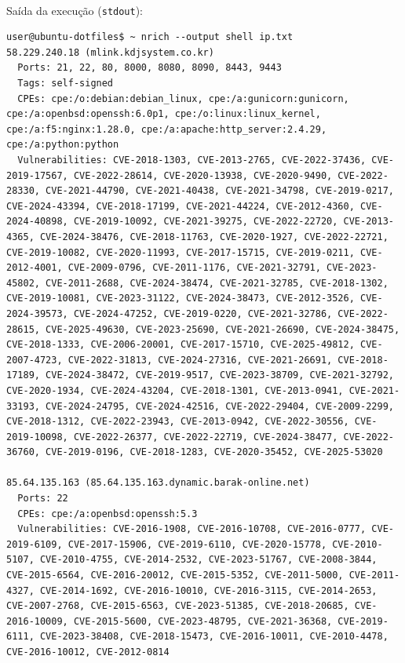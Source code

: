 \documentclass[12pt]{article}
\begin{document}
\paragraph{}Saída da execução (\texttt{stdout}):

\begin{lstlisting}
user@ubuntu-dotfiles$ ~ nrich --output shell ip.txt
58.229.240.18 (mlink.kdjsystem.co.kr)
  Ports: 21, 22, 80, 8000, 8080, 8090, 8443, 9443
  Tags: self-signed
  CPEs: cpe:/o:debian:debian_linux, cpe:/a:gunicorn:gunicorn, cpe:/a:openbsd:openssh:6.0p1, cpe:/o:linux:linux_kernel, cpe:/a:f5:nginx:1.28.0, cpe:/a:apache:http_server:2.4.29, cpe:/a:python:python
  Vulnerabilities: CVE-2018-1303, CVE-2013-2765, CVE-2022-37436, CVE-2019-17567, CVE-2022-28614, CVE-2020-13938, CVE-2020-9490, CVE-2022-28330, CVE-2021-44790, CVE-2021-40438, CVE-2021-34798, CVE-2019-0217, CVE-2024-43394, CVE-2018-17199, CVE-2021-44224, CVE-2012-4360, CVE-2024-40898, CVE-2019-10092, CVE-2021-39275, CVE-2022-22720, CVE-2013-4365, CVE-2024-38476, CVE-2018-11763, CVE-2020-1927, CVE-2022-22721, CVE-2019-10082, CVE-2020-11993, CVE-2017-15715, CVE-2019-0211, CVE-2012-4001, CVE-2009-0796, CVE-2011-1176, CVE-2021-32791, CVE-2023-45802, CVE-2011-2688, CVE-2024-38474, CVE-2021-32785, CVE-2018-1302, CVE-2019-10081, CVE-2023-31122, CVE-2024-38473, CVE-2012-3526, CVE-2024-39573, CVE-2024-47252, CVE-2019-0220, CVE-2021-32786, CVE-2022-28615, CVE-2025-49630, CVE-2023-25690, CVE-2021-26690, CVE-2024-38475, CVE-2018-1333, CVE-2006-20001, CVE-2017-15710, CVE-2025-49812, CVE-2007-4723, CVE-2022-31813, CVE-2024-27316, CVE-2021-26691, CVE-2018-17189, CVE-2024-38472, CVE-2019-9517, CVE-2023-38709, CVE-2021-32792, CVE-2020-1934, CVE-2024-43204, CVE-2018-1301, CVE-2013-0941, CVE-2021-33193, CVE-2024-24795, CVE-2024-42516, CVE-2022-29404, CVE-2009-2299, CVE-2018-1312, CVE-2022-23943, CVE-2013-0942, CVE-2022-30556, CVE-2019-10098, CVE-2022-26377, CVE-2022-22719, CVE-2024-38477, CVE-2022-36760, CVE-2019-0196, CVE-2018-1283, CVE-2020-35452, CVE-2025-53020

85.64.135.163 (85.64.135.163.dynamic.barak-online.net)
  Ports: 22
  CPEs: cpe:/a:openbsd:openssh:5.3
  Vulnerabilities: CVE-2016-1908, CVE-2016-10708, CVE-2016-0777, CVE-2019-6109, CVE-2017-15906, CVE-2019-6110, CVE-2020-15778, CVE-2010-5107, CVE-2010-4755, CVE-2014-2532, CVE-2023-51767, CVE-2008-3844, CVE-2015-6564, CVE-2016-20012, CVE-2015-5352, CVE-2011-5000, CVE-2011-4327, CVE-2014-1692, CVE-2016-10010, CVE-2016-3115, CVE-2014-2653, CVE-2007-2768, CVE-2015-6563, CVE-2023-51385, CVE-2018-20685, CVE-2016-10009, CVE-2015-5600, CVE-2023-48795, CVE-2021-36368, CVE-2019-6111, CVE-2023-38408, CVE-2018-15473, CVE-2016-10011, CVE-2010-4478, CVE-2016-10012, CVE-2012-0814


\end{lstlisting}
\end{document}
